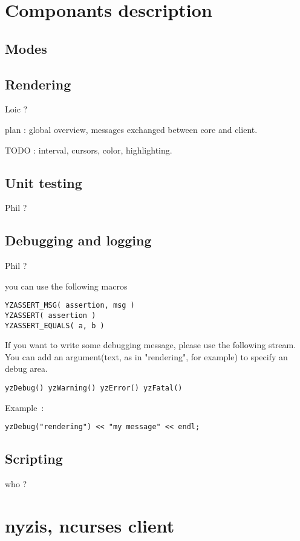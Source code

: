 \documentclass[a4paper,12pt]{report}
\begin{document}
\chapter{Componants description}

\section{Modes}


\section{Rendering}

Loic ?

plan : global overview, messages exchanged between core and client.

TODO : interval, cursors, color, highlighting.

\section{Unit testing}

Phil ?

\section{Debugging and logging}

Phil ?

you can use the following macros
\begin{verbatim}
YZASSERT_MSG( assertion, msg )
YZASSERT( assertion )
YZASSERT_EQUALS( a, b )
\end{verbatim}

If you want to write some debugging message, please use the following
stream. You can add an argument(text, as in "rendering", for example) to specify an debug area.
\begin{verbatim}
yzDebug() yzWarning() yzError() yzFatal()
\end{verbatim}
Example~:
\begin{verbatim}
yzDebug("rendering") << "my message" << endl;
\end{verbatim}


\section{Scripting}

who ?

\chapter{nyzis, ncurses client}
\end{document}
